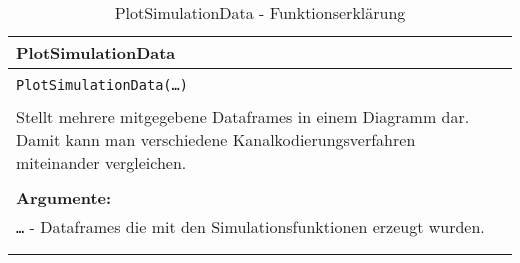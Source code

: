 \begin{longtable}{|p{\textwidth}|}
\hline
\rowcolor{lightblue}PlotSimulationData\\
\hline
\\
\texttt{PlotSimulationData(\dots)}\\
\\
Stellt mehrere mitgegebene Dataframes in einem Diagramm dar. Damit kann man verschiedene Kanalkodierungsverfahren miteinander vergleichen.\\
\\
\textbf{Argumente:}\\
\texttt{\dots} - Dataframes die mit den Simulationsfunktionen erzeugt wurden.\\	
\\
\hline
\caption[PlotSimulationData]{PlotSimulationData - Funktionserklärung}
\end{longtable}